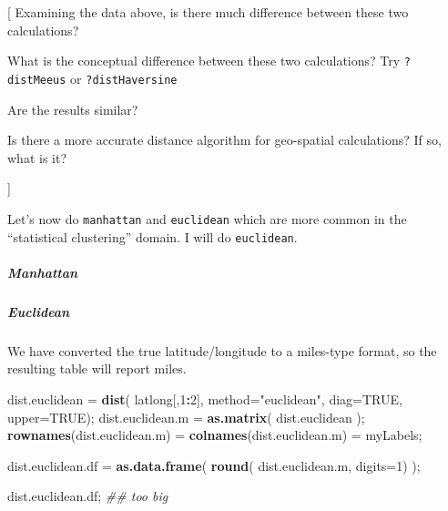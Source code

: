 \documentclass[
]{article}
\newenvironment{Shaded}{\begin{snugshade}}{\end{snugshade}}
\newcommand{\CommentTok}[1]{\textcolor[rgb]{0.56,0.35,0.01}{\textit{#1}}}
\newcommand{\DataTypeTok}[1]{\textcolor[rgb]{0.13,0.29,0.53}{#1}}
\newcommand{\DecValTok}[1]{\textcolor[rgb]{0.00,0.00,0.81}{#1}}
\newcommand{\KeywordTok}[1]{\textcolor[rgb]{0.13,0.29,0.53}{\textbf{#1}}}
\newcommand{\NormalTok}[1]{#1}
\newcommand{\OperatorTok}[1]{\textcolor[rgb]{0.81,0.36,0.00}{\textbf{#1}}}
\newcommand{\OtherTok}[1]{\textcolor[rgb]{0.56,0.35,0.01}{#1}}
\newcommand{\StringTok}[1]{\textcolor[rgb]{0.31,0.60,0.02}{#1}}
\begin{document}
{[} Examining the data above, is there much difference between these two
calculations?

What is the conceptual difference between these two calculations? Try
\texttt{?distMeeus} or \texttt{?distHaversine}

Are the results similar?

Is there a more accurate distance algorithm for geo-spatial
calculations? If so, what is it?

{]}

Let's now do \texttt{manhattan} and \texttt{euclidean} which are more
common in the ``statistical clustering'' domain. I will do
\texttt{euclidean}.

\hypertarget{manhattan}{%
\subparagraph{\texorpdfstring{\textbf{Manhattan}}{Manhattan}}\label{manhattan}}

\hypertarget{euclidean}{%
\subparagraph{\texorpdfstring{\textbf{Euclidean}}{Euclidean}}\label{euclidean}}

We have converted the true latitude/longitude to a miles-type format, so
the resulting table will report miles.

\begin{Shaded}
\begin{Highlighting}[]
\NormalTok{dist.euclidean =}\StringTok{ }\KeywordTok{dist}\NormalTok{( latlong[,}\DecValTok{1}\OperatorTok{:}\DecValTok{2}\NormalTok{],}
                      \DataTypeTok{method=}\StringTok{"euclidean"}\NormalTok{, }\DataTypeTok{diag=}\OtherTok{TRUE}\NormalTok{, }\DataTypeTok{upper=}\OtherTok{TRUE}\NormalTok{);}
\NormalTok{dist.euclidean.m =}\StringTok{ }\KeywordTok{as.matrix}\NormalTok{( dist.euclidean );}
  \KeywordTok{rownames}\NormalTok{(dist.euclidean.m) =}\StringTok{ }
\StringTok{  }\KeywordTok{colnames}\NormalTok{(dist.euclidean.m) =}\StringTok{ }\NormalTok{myLabels;}

\NormalTok{dist.euclidean.df =}\StringTok{ }\KeywordTok{as.data.frame}\NormalTok{( }\KeywordTok{round}\NormalTok{( dist.euclidean.m, }\DataTypeTok{digits=}\DecValTok{1}\NormalTok{) );}

\NormalTok{dist.euclidean.df;  }\CommentTok{\#\# too big}
\end{Highlighting}
\end{Shaded}
\end{document}
